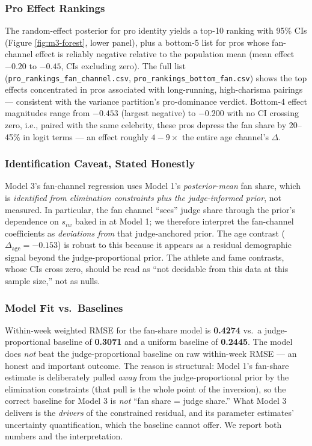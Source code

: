 \documentclass{article}
\begin{document}
\subsubsection{Pro Effect Rankings}

The random-effect posterior for pro identity yields a top-10 ranking with 95\% CIs (Figure \ref{fig:m3-forest}, lower panel), plus a bottom-5 list for pros whose fan-channel effect is reliably negative relative to the population mean (mean effect $-0.20$ to $-0.45$, CIs excluding zero). The full list (\texttt{pro\_rankings\_fan\_channel.csv}, \texttt{pro\_rankings\_bottom\_fan.csv}) shows the top effects concentrated in pros associated with long-running, high-charisma pairings --- consistent with the variance partition's pro-dominance verdict. Bottom-4 effect magnitudes range from $-0.453$ (largest negative) to $-0.200$ with no CI crossing zero, i.e., paired with the same celebrity, these pros depress the fan share by 20--45\% in logit terms --- an effect roughly $4{-}9\times$ the entire age channel's $\Delta$.

\subsubsection{Identification Caveat, Stated Honestly}

Model 3's fan-channel regression uses Model 1's \emph{posterior-mean} fan share, which is \emph{identified from elimination constraints plus the judge-informed prior}, not measured. In particular, the fan channel ``sees'' judge share through the prior's dependence on $s_{iw}$ baked in at Model 1; we therefore interpret the fan-channel coefficients as \emph{deviations from} that judge-anchored prior. The age contrast ($\Delta_{\text{age}} = -0.153$) is robust to this because it appears as a residual demographic signal beyond the judge-proportional prior. The athlete and fame contrasts, whose CIs cross zero, should be read as ``not decidable from this data at this sample size,'' not as nulls.

\subsubsection{Model Fit vs.\ Baselines}

Within-week weighted RMSE for the fan-share model is \textbf{0.4274} vs.\ a judge-proportional baseline of \textbf{0.3071} and a uniform baseline of \textbf{0.2445}. The model does \emph{not} beat the judge-proportional baseline on raw within-week RMSE --- an honest and important outcome. The reason is structural: Model 1's fan-share estimate is deliberately pulled \emph{away} from the judge-proportional prior by the elimination constraints (that pull is the whole point of the inversion), so the correct baseline for Model 3 is \emph{not} ``fan share = judge share.'' What Model 3 delivers is the \emph{drivers} of the constrained residual, and its parameter estimates' uncertainty quantification, which the baseline cannot offer. We report both numbers and the interpretation.
\end{document}
